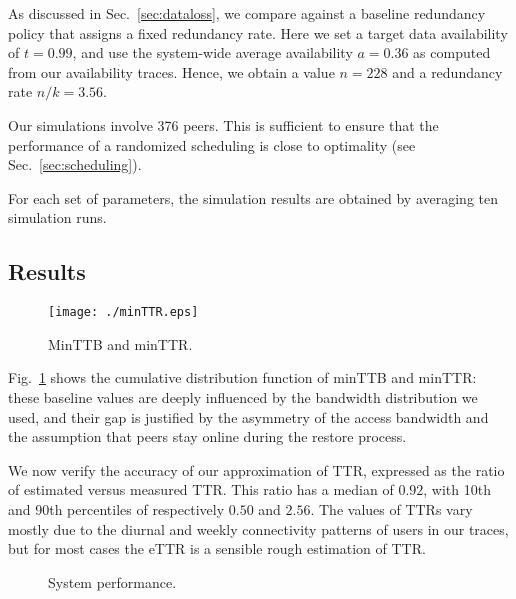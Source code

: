 \documentclass[conference,10pt]{IEEEtran}
\begin{document}
As discussed in Sec.~\ref{sec:dataloss}, we compare against a baseline redundancy policy that assigns a fixed redundancy rate. Here we set a target data availability of $t=0.99$, and use the system-wide average availability $a=0.36$ as computed from our availability traces. Hence, we obtain a value $n=228$ and a redundancy rate $n / k = 3.56$. 

Our simulations involve 376 peers. This is sufficient to ensure that the performance of a randomized scheduling is close to optimality (see Sec.~\ref{sec:scheduling}).


For each set of parameters, the simulation results are obtained by
averaging ten simulation runs.

\subsection{Results}

\begin{figure}
\centering

\texttt{[image: ./minTTR.eps]}
\caption{MinTTB and minTTR.}
\label{fig:minTTR}
\end{figure}

Fig.~\ref{fig:minTTR} shows the cumulative distribution function of minTTB and minTTR: these baseline values are deeply influenced by the bandwidth distribution we used, and their gap is justified by the asymmetry of the access bandwidth and the assumption that peers stay online during the restore process.


We now verify the accuracy of our approximation of TTR, expressed as the ratio of estimated versus measured TTR. This ratio has a median of $0.92$, with 10th and 90th percentiles of respectively $0.50$ and $2.56$. The values of TTRs vary mostly due to the diurnal and weekly connectivity patterns of users in our traces, but for most cases the eTTR is a sensible rough estimation of TTR.

\begin{figure*}
\centering
\caption{System performance.}
\label{fig:eTTRbased2}
\end{figure*}
\end{document}
